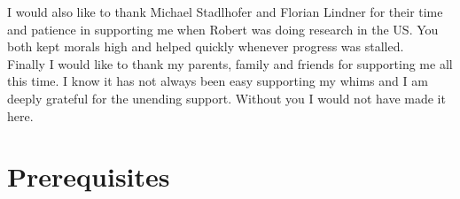 \documentclass[twoside,openright,listof=numbered]{scrreprt}
\begin{document}
I would also like to thank Michael Stadlhofer and Florian Lindner for their time and patience in supporting me when Robert was doing research in the US. You both kept morals high and helped quickly whenever progress was stalled.\\


Finally I would like to thank my parents, family and friends for supporting me all this time. I know it has not always been easy supporting my whims and I am deeply grateful for the unending support. Without you I would not have made it here.

\tableofcontents


\chapter{Prerequisites}
\end{document}
